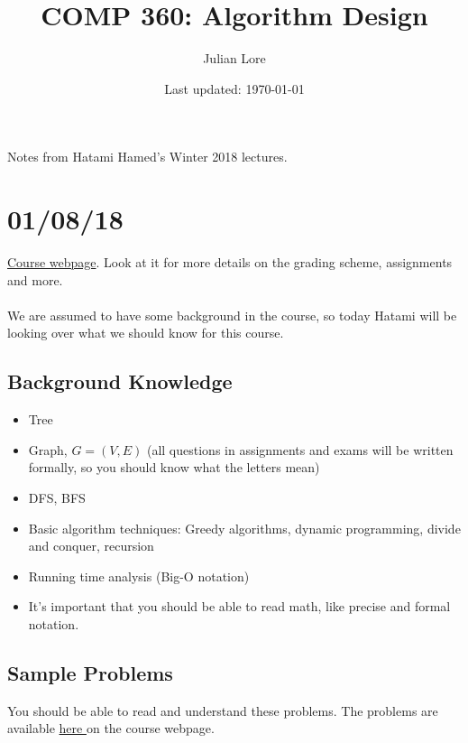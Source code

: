 \documentclass[12 pt]{article}
\author{Julian Lore}
\date{Last updated: \today}
\title{COMP 360: Algorithm Design}
\begin{document}
	\onehalfspacing
	\maketitle
	Notes from Hatami Hamed's Winter 2018 lectures.
	\tableofcontents
        \section{01/08/18}
        \href{www.cs.mcgill.ca/~hatami}{Course webpage}. Look at it
        for more details on the grading scheme, assignments and more.
        \paragraph{}We are assumed to have some background in the course, so
        today Hatami will be looking over what we should know for this
        course.
            \subsection{Background Knowledge}
                \begin{itemize}
                \item Tree
                \item Graph, $G=(V,E)$ (all questions in assignments and exams
                  will be written formally, so you should know what the
                  letters mean)
                \item DFS, BFS
                \item Basic algorithm techniques: Greedy algorithms, dynamic
                  programming, divide and conquer, recursion
                \item Running time analysis (Big-O notation)
                \item It's important that you should be able to read math,
                  like precise and formal notation. 
                \end{itemize}
                \subsection{Sample Problems}
                You should be able to read and understand these
                problems. The problems are available
                \href{http://cs.mcgill.ca/~hatami/comp360-W2018/files/test.pdf}{here
                } on the course webpage.
\end{document}
